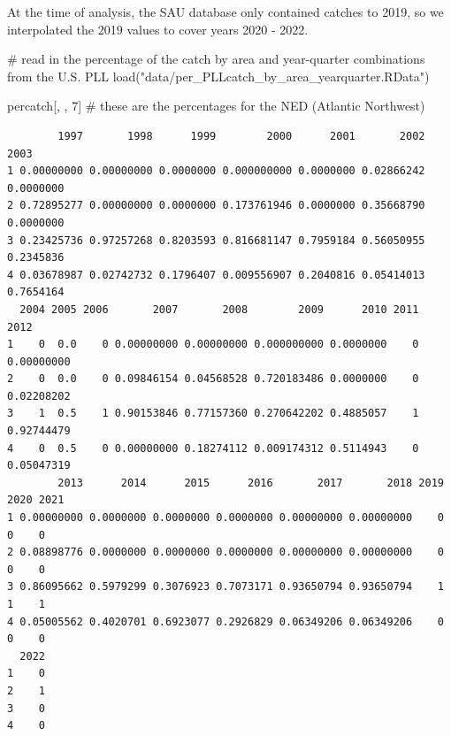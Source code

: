 \documentclass[
]{article}
\newenvironment{Shaded}{\begin{snugshade}}{\end{snugshade}}
\newcommand{\CommentTok}[1]{\textcolor[rgb]{0.37,0.37,0.37}{#1}}
\newcommand{\DecValTok}[1]{\textcolor[rgb]{0.68,0.00,0.00}{#1}}
\newcommand{\FunctionTok}[1]{\textcolor[rgb]{0.28,0.35,0.67}{#1}}
\newcommand{\NormalTok}[1]{\textcolor[rgb]{0.00,0.23,0.31}{#1}}
\newcommand{\StringTok}[1]{\textcolor[rgb]{0.13,0.47,0.30}{#1}}
\begin{document}
At the time of analysis, the SAU database only contained catches to
2019, so we interpolated the 2019 values to cover years 2020 - 2022.

\begin{Shaded}
\begin{Highlighting}[]
\CommentTok{\# read in the percentage of the catch by area and year{-}quarter combinations from the U.S. PLL}
\FunctionTok{load}\NormalTok{(}\StringTok{"data/per\_PLLcatch\_by\_area\_yearquarter.RData"}\NormalTok{)  }

\NormalTok{percatch[, , }\DecValTok{7}\NormalTok{] }\CommentTok{\# these are the percentages for the NED (Atlantic Northwest)}
\end{Highlighting}
\end{Shaded}

\begin{verbatim}
        1997       1998      1999        2000      2001       2002      2003
1 0.00000000 0.00000000 0.0000000 0.000000000 0.0000000 0.02866242 0.0000000
2 0.72895277 0.00000000 0.0000000 0.173761946 0.0000000 0.35668790 0.0000000
3 0.23425736 0.97257268 0.8203593 0.816681147 0.7959184 0.56050955 0.2345836
4 0.03678987 0.02742732 0.1796407 0.009556907 0.2040816 0.05414013 0.7654164
  2004 2005 2006       2007       2008        2009      2010 2011       2012
1    0  0.0    0 0.00000000 0.00000000 0.000000000 0.0000000    0 0.00000000
2    0  0.0    0 0.09846154 0.04568528 0.720183486 0.0000000    0 0.02208202
3    1  0.5    1 0.90153846 0.77157360 0.270642202 0.4885057    1 0.92744479
4    0  0.5    0 0.00000000 0.18274112 0.009174312 0.5114943    0 0.05047319
        2013      2014      2015      2016       2017       2018 2019 2020 2021
1 0.00000000 0.0000000 0.0000000 0.0000000 0.00000000 0.00000000    0    0    0
2 0.08898776 0.0000000 0.0000000 0.0000000 0.00000000 0.00000000    0    0    0
3 0.86095662 0.5979299 0.3076923 0.7073171 0.93650794 0.93650794    1    1    1
4 0.05005562 0.4020701 0.6923077 0.2926829 0.06349206 0.06349206    0    0    0
  2022
1    0
2    1
3    0
4    0
\end{verbatim}
\end{document}
